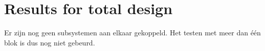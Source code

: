 \chapter{Results for total design}
Er zijn nog geen subsystemen aan elkaar gekoppeld. Het testen met meer dan \'e\'en blok is dus nog niet gebeurd.